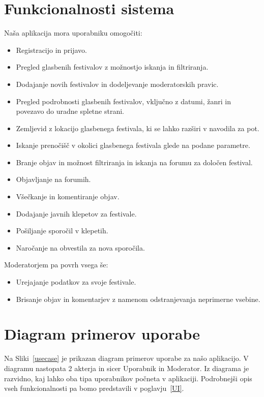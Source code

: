 \documentclass[a4paper,12pt,openright]{book}
\begin{document}
\section{Funkcionalnosti sistema}
Naša aplikacija mora uporabniku omogočiti:
\begin{itemize}
    \item Registracijo in prijavo.
    \item Pregled glasbenih festivalov z možnostjo iskanja in filtriranja.
    \item Dodajanje novih festivalov in dodeljevanje moderatorskih pravic.
    \item Pregled podrobnosti glasbenih festivalov, vključno z datumi, žanri in povezavo do uradne spletne strani.
    \item Zemljevid z lokacijo glasbenega festivala, ki se lahko razširi v navodila za pot.
    \item Iskanje prenočišč v okolici glasbenega festivala glede na podane parametre.
    \item Branje objav in možnost filtriranja in iskanja na forumu za določen festival.
    \item Objavljanje na forumih.
    \item Všečkanje in komentiranje objav.
    \item Dodajanje javnih klepetov za festivale.
    \item Pošiljanje sporočil v klepetih.
    \item Naročanje na obvestila za nova sporočila.
\end{itemize}

Moderatorjem pa povrh vsega še:
\begin{itemize}
    \item Urejajanje podatkov za svoje festivale.
    \item Brisanje objav in komentarjev z namenom odstranjevanja neprimerne vsebine.
\end{itemize}

\section{Diagram primerov uporabe}
Na Sliki~\ref{usecase} je prikazan diagram primerov uporabe za našo aplikacijo. 
V diagramu nastopata 2 akterja in sicer Uporabnik in Moderator.
Iz diagrama je razvidno, kaj lahko oba tipa uporabnikov počneta v aplikaciji.
Podrobnejši opis vseh funkcionalnosti pa bomo predstavili v poglavju~\ref{UI}.
\end{document}
